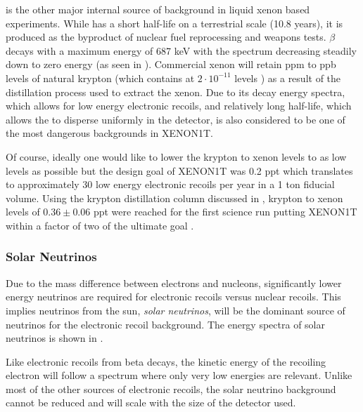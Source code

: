 \krypton{} is the other major internal source of background in liquid xenon based experiments.  While \krypton{} has a short half-life on a terrestrial scale (10.8 years), it is produced as the byproduct of nuclear fuel reprocessing and weapons tests.  \krypton{} $\beta$ decays with a maximum energy of 687 keV with the spectrum decreasing steadily down to zero energy (as seen in ).  Commercial xenon will retain ppm to ppb levels of natural krypton (which contains \krypton{} at $2 \cdot 10^{-11}$ levels \cite{du2004atom}) as a result of the distillation process used to extract the xenon.  Due to its decay energy spectra, which allows for low energy electronic recoils, and relatively long half-life, which allows the \krypton{} to disperse uniformly in the detector, \krypton{} is also considered to be one of the most dangerous backgrounds in XENON1T.  

Of course, ideally one would like to lower the krypton to xenon levels to as low levels as possible but the design goal of XENON1T was 0.2 ppt which translates to approximately 30 low energy electronic recoils per year in a 1 ton fiducial volume.  Using the krypton distillation column discussed in , krypton to xenon levels of $0.36 \pm 0.06$ ppt were reached for the first science run putting XENON1T within a factor of two of the ultimate goal \cite{aprile2017xenon1t}.


\subsubsection{Solar Neutrinos}
\label{sec:xe1t_er_bkg_neutrinos}

Due to the mass difference between electrons and nucleons, significantly lower energy neutrinos are required for electronic recoils versus nuclear recoils.  This implies neutrinos from the sun, \textit{solar neutrinos}, will be the dominant source of neutrinos for the electronic recoil background.  The energy spectra of solar neutrinos is shown in .  

Like electronic recoils from beta decays, the kinetic energy of the recoiling electron will follow a spectrum where only very low energies are relevant.  Unlike most of the other sources of electronic recoils, the solar neutrino background cannot be reduced and will scale with the size of the detector used.


\subsubsection{\radioxenon}
\label{sec:xe1t_radioxenon}

